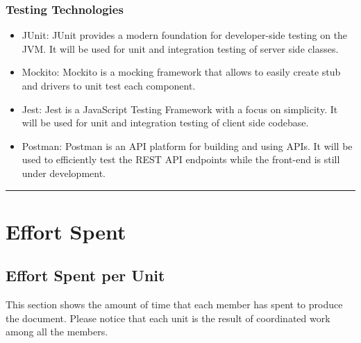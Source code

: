 \documentclass{Configuration_Files/Template}
\begin{document}
\subsection{Testing Technologies}
\begin{itemize}
    \item \textcolor{bluepoli}{JUnit}: JUnit provides a modern foundation for developer-side testing on the JVM. It will be used for unit and integration testing of server side classes.
    \item \textcolor{bluepoli}{Mockito}: Mockito is a mocking framework that allows to easily create stub and drivers to unit test each component.
    \item \textcolor{bluepoli}{Jest}: Jest is a JavaScript Testing Framework with a focus on simplicity. It will be used for unit and integration testing of client side codebase.
    \item \textcolor{bluepoli}{Postman}: Postman is an API platform for building and using APIs. It will be used to efficiently test the REST API endpoints while the front-end is still under development.
\end{itemize}

{\color{bluepoli}\rule{\linewidth}{0.1pt}}

\chapter{Effort Spent}

\section{Effort Spent per Unit}

This section shows the amount of time that each member has spent to produce the document. Please notice that each unit is the result of coordinated work among all the members.
\end{document}
